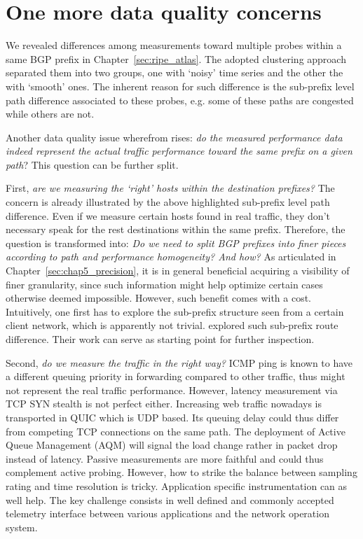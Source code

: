 \section{One more data quality concerns}
We revealed differences among measurements toward multiple probes within a same BGP prefix in Chapter~\ref{sec:ripe_atlas}. The adopted clustering approach separated them into two groups, one with `noisy' time series and the other the with `smooth' ones. The inherent reason for such difference is the sub-prefix level path difference associated to these probes, e.g. some of these paths are congested while others are not.

Another data quality issue wherefrom rises: \textit{do the measured performance data indeed represent the actual traffic performance toward the same prefix on a given path}?
This question can be further split. 

First, \textit{are we measuring the `right' hosts within the destination prefixes?} The concern is already illustrated by the above highlighted sub-prefix level path difference. Even if we measure certain hosts found in real traffic, they don't necessary speak for the rest destinations within the same prefix.
Therefore, the question is transformed into: \textit{Do we need to split BGP prefixes into finer pieces according to path and performance homogeneity? And how?}
As articulated in Chapter~\ref{sec:chap5_precision}, it is in general beneficial acquiring a visibility of finer granularity, since such information might help optimize certain cases otherwise deemed impossible.
However, such benefit comes with a cost. Intuitively, one first has to explore the sub-prefix structure seen from a certain client network, which is apparently not trivial.
\citet{Lee2016} explored such sub-prefix route difference. Their work can serve as starting point for further inspection.

Second, \textit{do we measure the traffic in the right way?} ICMP ping is known to have a different queuing priority in forwarding compared to other traffic, thus might not represent the real traffic performance. However, latency measurement via TCP SYN stealth is not perfect either. Increasing web traffic nowadays is transported in QUIC which is UDP based. Its queuing delay could thus differ from competing TCP connections on the same path.
The deployment of Active Queue Management (AQM) will signal the load change rather in packet drop instead of latency.
Passive measurements are more faithful and could thus complement active probing. However, how to strike the balance between sampling rating and time resolution is tricky.
Application specific instrumentation can as well help. The key challenge consists in well defined and commonly accepted telemetry interface between various applications and the network operation system.


